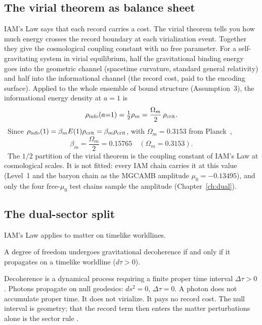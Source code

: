 \subsection{The virial theorem as balance sheet}\label{sec:law_coupling}
IAM's Law says that each record carries a cost. The virial theorem tells you how much energy crosses the record boundary at each virialization event.
Together they give the cosmological coupling constant with no free parameter. For a self-gravitating system in virial equilibrium, half the gravitational
binding energy goes into the geometric channel (spacetime curvature, standard general relativity) and half into the informational channel (the record
cost, paid to the encoding surface). Applied to the whole ensemble of bound structure (Assumption~3), the informational energy density at $a=1$ is
\begin{equation}
\rho_{\rm info}(a{=}1)=\tfrac12\rho_m=\frac{\Omega_m}{2}\,\rho_{\rm crit}. \label{eq:law_rhoinfo1}
\end{equation}
\prediction\ Since $\rho_{\rm info}(1)=\beta_mE(1)\rho_{\rm crit}=\beta_m\rho_{\rm crit}$, with $\Omega_m=0.3153$ from Planck~\cite{Planck2018VI},
\begin{equation}
\beta_m=\frac{\Omega_m}{2}=0.15765\quad(\Omega_m=0.3153). \label{eq:law_beta}
\end{equation}
\prediction\ The $1/2$ partition of the virial theorem is the coupling constant of IAM's Law at cosmological scales. It is not fitted: every IAM
chain carries it at this value (Level~1 and the baryon chain as the MGCAMB amplitude $\mu_0=-0.13495$), and only the four free-$\mu_0$ test chains sample the amplitude (Chapter~\ref{ch:dual}).

\subsection{The dual-sector split}\label{sec:law_dualsector}
IAM's Law applies to matter on timelike worldlines.
\begin{definition}
A degree of freedom undergoes gravitational decoherence if and only if it propagates on a timelike worldline ($d\tau>0$).
\end{definition}
Decoherence is a dynamical process requiring a finite proper time interval $\Delta\tau>0$. Photons propagate on null geodesics: $ds^2=0$, $\Delta\tau=0$. A
photon does not accumulate proper time. It does not virialize. It pays no record cost. The null interval is geometry; that the record term then enters the
matter perturbations alone is the sector rule \conjecture.

